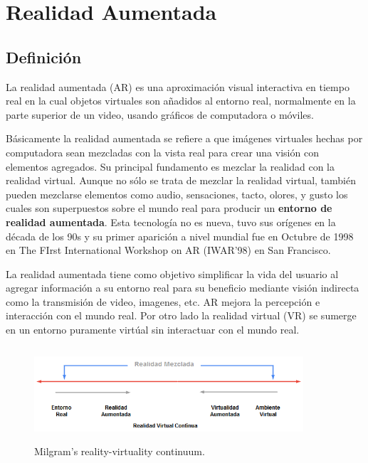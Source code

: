 \newpage
\section{Realidad Aumentada}
\setcounter{secnumdepth}{2}

\subsection{Definición}
La realidad aumentada (AR) es una aproximación visual interactiva en tiempo real en la cual objetos virtuales son añadidos al entorno real, normalmente en la parte superior de un video, usando gráficos de computadora o móviles.\cite{B04} \par
\vspace{5mm}
Básicamente la realidad aumentada se refiere a que imágenes virtuales hechas por computadora sean mezcladas con la vista real para crear una visión con elementos agregados. Su principal fundamento es mezclar la realidad con la realidad virtual. Aunque no sólo se trata de mezclar la realidad virtual, también pueden mezclarse elementos como audio, sensaciones, tacto, olores, y gusto los cuales son superpuestos sobre el mundo real para producir un \textbf{entorno de realidad aumentada}.\cite{B05}
Esta tecnología no es nueva, tuvo sus orígenes en la década de los 90s\cite{B04} y su primer aparición a nivel mundial fue en Octubre de 1998 en The FIrst International Workshop on AR (IWAR'98) en San Francisco\cite{B05}.\par 
\vspace{5mm}
La realidad aumentada tiene como objetivo simplificar la vida del usuario al agregar información a su entorno real para su beneficio mediante visión indirecta como la transmisión de video, imagenes, etc. AR mejora la percepción e interacción con el mundo real. Por otro lado la realidad virtual (VR) se sumerge en un entorno puramente virtúal sin interactuar con el mundo real.\cite{BXX}\par
\begin{figure}[h!]
	\centering
	\includegraphics[width=10cm,height=3.5cm]{imagenes/marcoteorico/ar/Mixed_Reallity.png}
	\caption{Milgram’s reality-virtuality continuum.\cite{BXX}}
	\label{fig:analogo}
\end{figure}
